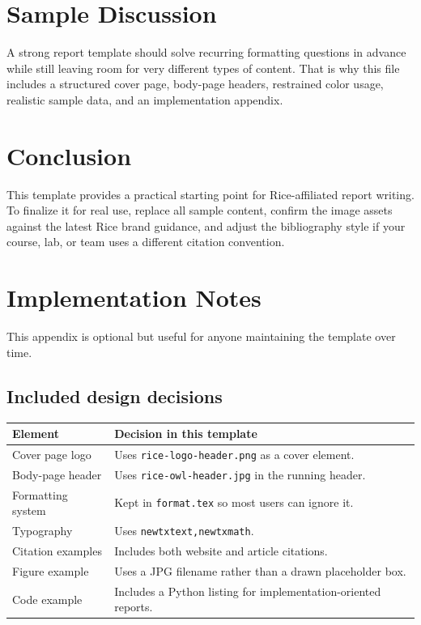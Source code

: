 \documentclass[11pt,letterpaper]{article}
\begin{document}
\section{Sample Discussion}

A strong report template should solve recurring formatting questions in advance while still leaving room for very different types of content. That is why this file includes a structured cover page, body-page headers, restrained color usage, realistic sample data, and an implementation appendix.

\section{Conclusion}

This template provides a practical starting point for Rice-affiliated report writing. To finalize it for real use, replace all sample content, confirm the image assets against the latest Rice brand guidance, and adjust the bibliography style if your course, lab, or team uses a different citation convention.

\newpage



\appendix
\newpage

\section{Implementation Notes}

This appendix is optional but useful for anyone maintaining the template over time.

\subsection{Included design decisions}
\begin{longtable}{@{}p{}p{}@{}}
\toprule
\textbf{Element} & \textbf{Decision in this template} \\
\midrule
Cover page logo & Uses \texttt{rice-logo-header.png} as a cover element. \\
Body-page header & Uses \texttt{rice-owl-header.jpg} in the running header. \\
Formatting system & Kept in \texttt{format.tex} so most users can ignore it. \\
Typography & Uses \texttt{newtxtext,newtxmath}. \\
Citation examples & Includes both website and article citations. \\
Figure example & Uses a JPG filename rather than a drawn placeholder box. \\
Code example & Includes a Python listing for implementation-oriented reports. \\
\bottomrule
\end{longtable}
\end{document}
